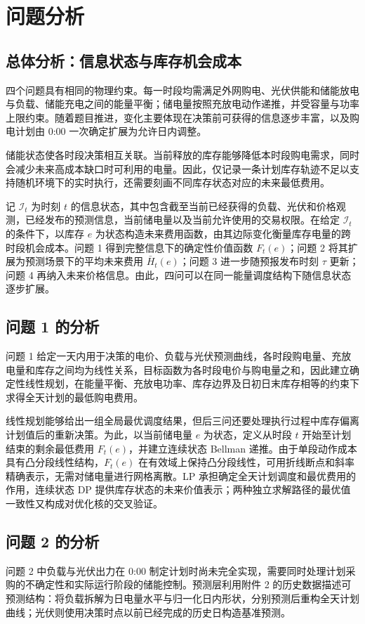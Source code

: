 \section{问题分析}
\subsection{总体分析：信息状态与库存机会成本}
四个问题具有相同的物理约束。每一时段均需满足外网购电、光伏供能和储能放电与负载、储能充电之间的能量平衡；储电量按照充放电动作递推，并受容量与功率上限约束。随着题目推进，变化主要体现在决策前可获得的信息逐步丰富，以及购电计划由 0:00 一次确定扩展为允许日内调整。

储能状态使各时段决策相互关联。当前释放的库存能够降低本时段购电需求，同时会减少未来高成本缺口时可利用的电量。因此，仅记录一条计划库存轨迹不足以支持随机环境下的实时执行，还需要刻画不同库存状态对应的未来最低费用。

记 $\mathcal I_t$ 为时刻 $t$ 的信息状态，其中包含截至当前已经获得的负载、光伏和价格观测，已经发布的预测信息，当前储电量以及当前允许使用的交易权限。在给定 $\mathcal I_t$ 的条件下，以库存 $e$ 为状态构造未来费用函数，由其边际变化衡量库存电量的跨时段机会成本。问题 1 得到完整信息下的确定性价值函数 $F_t(e)$；问题 2 将其扩展为预测场景下的平均未来费用 $\bar H_t(e)$；问题 3 进一步随预报发布时刻 $\tau$ 更新；问题 4 再纳入未来价格信息。由此，四问可以在同一能量调度结构下随信息状态逐步扩展。

\subsection{问题 1 的分析}
问题 1 给定一天内用于决策的电价、负载与光伏预测曲线，各时段购电量、充放电量和库存之间均为线性关系，目标函数为各时段电价与购电量之和，因此建立确定性线性规划，在能量平衡、充放电功率、库存边界及日初日末库存相等的约束下求得全天计划的最低购电费用。

线性规划能够给出一组全局最优调度结果，但后三问还要处理执行过程中库存偏离计划值后的重新决策。为此，以当前储电量 $e$ 为状态，定义从时段 $t$ 开始至计划结束的剩余最低费用 $F_t(e)$，并建立连续状态 Bellman 递推。由于单段动作成本具有凸分段线性结构，$F_t(e)$ 在有效域上保持凸分段线性，可用折线断点和斜率精确表示，无需对储电量进行网格离散。LP 承担确定全天计划调度和最优费用的作用，连续状态 DP 提供库存状态的未来价值表示；两种独立求解路径的最优值一致性又构成对优化核的交叉验证。

\subsection{问题 2 的分析}
问题 2 中负载与光伏出力在 0:00 制定计划时尚未完全实现，需要同时处理计划采购的不确定性和实际运行阶段的储能控制。预测层利用附件 2 的历史数据描述可预测结构：将负载拆解为日电量水平与归一化日内形状，分别预测后重构全天计划曲线；光伏则使用决策时点以前已经完成的历史日构造基准预测。

